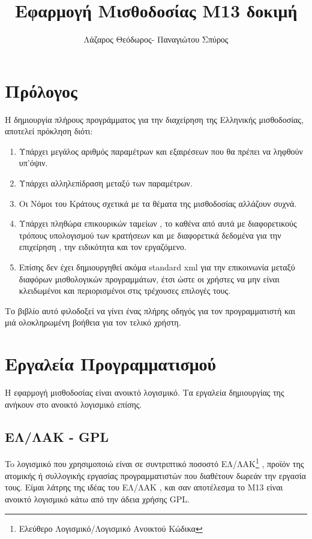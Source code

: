 \documentclass[A4,10pt,greek]{book}
\title{Εφαρμογή Μισθοδοσίας M13 δοκιμή}
\author{Λάζαρος Θεόδωρος- Παναγιώτου Σπύρος}
\begin{document}
\maketitle

\tableofcontents

\frontmatter
\chapter{Πρόλογος}
Η δημιουργία πλήρους προγράμματος για την διαχείρηση της Ελληνικής μισθοδοσίας, αποτελεί πρόκληση διότι:
\begin{enumerate}
\item Υπάρχει μεγάλος αριθμός παραμέτρων και εξαιρέσεων που θα πρέπει να ληφθούν υπ'όψιν.
\item Υπάρχει αλληλεπίδραση μεταξύ των παραμέτρων.
\item Οι Νόμοι του Κράτους σχετικά με τα θέματα της μισθοδοσίας αλλάζουν συχνά. 
\item Υπάρχει πληθώρα επικουρικών ταμείων , το καθένα από αυτά με διαφορετικούς τρόπους υπολογισμού των κρατήσεων και με διαφορετικά δεδομένα για την επιχείρηση , την ειδικότητα και τον εργαζόμενο.
\item Επίσης δεν έχει δημιουργηθεί ακόμα standard xml για την επικοινωνία μεταξύ διαφόρων μισθολογικών προγραμμάτων, έτσι ώστε οι χρήστες να μην είναι κλειδωμένοι και περιορισμένοι στις τρέχουσες επιλογές τους.  

\end{enumerate}

Το βιβλίο αυτό φιλοδοξεί να γίνει ένας πλήρης οδηγός για τον προγραμματιστή και μιά ολοκληρωμένη βοήθεια για τον τελικό χρήστη. 

\mainmatter
\chapter{ Εργαλεία Προγραμματισμού}
Η εφαρμογή μισθοδοσίας είναι ανοικτό λογισμικό. Τα εργαλεία δημιουργίας της ανήκουν στο ανοικτό λογισμικό επίσης.

\section{ΕΛ/ΛΑΚ - GPL }
 To λογισμικό που χρησιμοποιώ είναι σε συντριπτικό ποσοστό ΕΛ/ΛΑΚ\footnote{Ελεύθερο Λογισμικό/Λογισμικό Ανοικτού Κώδικα} , προϊόν της ατομικής ή συλλογικής εργασίας προγραμματιστών που διαθέτουν δωρεάν την εργασία τους. Είμαι λάτρης της ιδέας του ΕΛ/ΛΑΚ , και σαν αποτέλεσμα το M13 είναι ανοικτό λογισμικό κάτω από την άδεια χρήσης GPL. 
\end{document}
